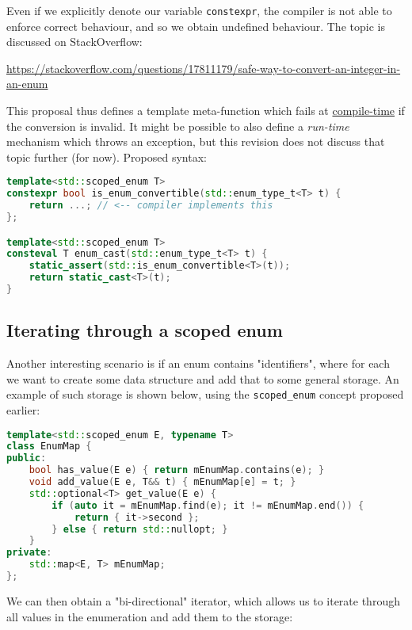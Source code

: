 \documentclass[
  format=manuscript,
  screen=true,
  review=false,
  nonacm=true,
  timestamp=true,
  balance=false]{acmart}
\begin{document}
\noindent
Even if we explicitly denote our variable \texttt{constexpr}, the compiler is not
able to enforce correct behaviour, and so we obtain undefined behaviour. The topic
is discussed on StackOverflow:

\noindent
\url{https://stackoverflow.com/questions/17811179/safe-way-to-convert-an-integer-in-an-enum}

\vspace{3mm}\noindent
This proposal thus defines a template meta-function which fails at
\underline{compile-time} if the conversion is invalid. It might be possible to also
define a \textit{run-time} mechanism which throws an exception, but this revision
does not discuss that topic further (for now). Proposed syntax:\vspace{2mm}

\begin{lstlisting}[language=Cpp]
template<std::scoped_enum T>
constexpr bool is_enum_convertible(std::enum_type_t<T> t) {
    return ...; // <-- compiler implements this
};

template<std::scoped_enum T>
consteval T enum_cast(std::enum_type_t<T> t) {
    static_assert(std::is_enum_convertible<T>(t));
    return static_cast<T>(t);
}
\end{lstlisting}


\subsection{Iterating through a scoped enum}

Another interesting scenario is if an enum contains "identifiers", where for each we
want to create some data structure and add that to some general storage. An example
of such storage is shown below, using the \texttt{scoped\_enum} concept proposed
earlier:\vspace{2mm}

\begin{lstlisting}[language=Cpp]
template<std::scoped_enum E, typename T>
class EnumMap {
public:
    bool has_value(E e) { return mEnumMap.contains(e); }
    void add_value(E e, T&& t) { mEnumMap[e] = t; }
    std::optional<T> get_value(E e) {
        if (auto it = mEnumMap.find(e); it != mEnumMap.end()) {
            return { it->second };
        } else { return std::nullopt; }
    }
private:
    std::map<E, T> mEnumMap;
};
\end{lstlisting}

We can then obtain a "bi-directional" iterator, which allows us to iterate through
all values in the enumeration and add them to the storage:\vspace{2mm}
\end{document}
